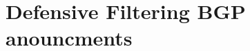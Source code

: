 \documentclass[notes=hide,yellow]{beamer}
\begin{document}
\section{Defensive Filtering BGP anouncments}
\subsection*{}
%
%
%
%
%
%
%
%
%
%
%
%
%
%
%
%
%
%
%
\end{document}
